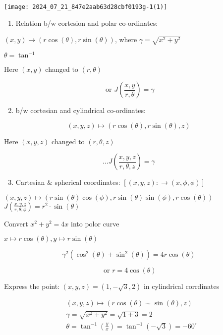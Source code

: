 \documentclass[12pt, a4paper]{article}
\begin{document}
\begin{center}
\texttt{[image: 2024\_07\_21\_847e2aab63d28cbf0193g-1(1)]}
\end{center}

\begin{enumerate}
  \item Relation b/w cortesion and polar co-ordinates:
\end{enumerate}

$(x, y) \mapsto(r \cos (\theta), r \sin (\theta))$, where $\gamma=\sqrt{x^{2}+y^{2}}$

$\theta=\tan ^{-1}$

Here $(x, y)$ changed to $(r, \theta)$

$$
\text { or } J\left(\frac{x, y}{r, \theta}\right)=\gamma
$$

\begin{enumerate}
  \setcounter{enumi}{1}
  \item b/w cortesian and cylindrical co-ordinates:
\end{enumerate}

$$
(x, y, z) \longmapsto(r \cos (\theta), r \sin (\theta), z)
$$

Here $(x, y, z)$ changed to $(r, \theta, z)$

$$
\ldots J\left(\frac{x, y, z}{r, \theta, z}\right)=\gamma
$$

\begin{enumerate}
  \setcounter{enumi}{2}
  \item Cartesian \& spherical coordinates: $[(x, y, z): \rightarrow(x, \phi, \phi)]$
\end{enumerate}

$(x, y, z) \longmapsto(r \sin (\theta) \cos (\phi), r \sin (\theta) \sin (\phi), r \cos (\theta))$ $J\left(\frac{x, y, z}{r, \theta, \phi}\right)=r^{2} \cdot \sin (\theta)$

Convert $x^{2}+y^{2}=4 x$ into polor curve

$x \mapsto r \cos (\theta), y \mapsto r \sin (\theta)$

$$
\gamma^{2}\left(\cos ^{2}(\theta)+\sin ^{2}(\theta)\right)=4 r \cos (\theta)
$$

$$
\text { or } r=4 \cos (\theta)
$$

Express the point: $(x, y, z)=(1,-\sqrt{3}, 2)$ in cylindrical corrdinates

$$
\begin{aligned}
& (x, y, z) \longmapsto(r \cos (\theta) \sim \sin (\theta), z) \\
& \gamma=\sqrt{x^{2}+y^{2}}=\sqrt{1+3}=2 \\
& \theta=\tan ^{-1}\left(\frac{y}{x}\right)=\tan ^{-1}(-\sqrt{3})=-60^{\circ}
\end{aligned}
$$
\end{document}
